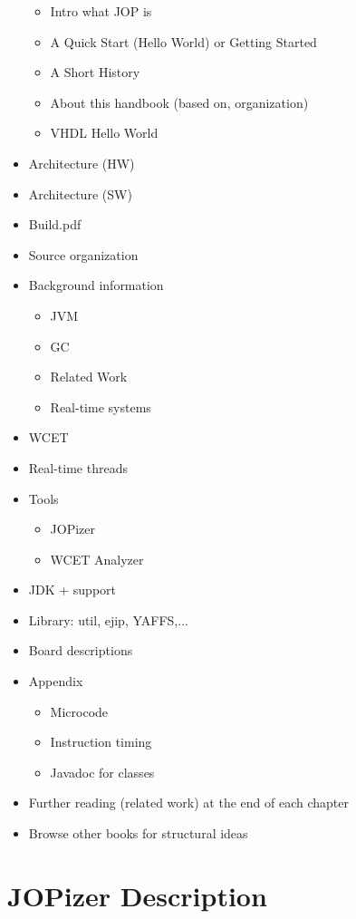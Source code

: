 \begin{itemize}
    \begin{itemize}
        \item Intro what JOP is
        \item A Quick Start (Hello World) or Getting Started
        \item A Short History
        \item About this handbook (based on, organization)
        \item VHDL Hello World
    \end{itemize}
    \item Architecture (HW)
    \item Architecture (SW)
    \item Build.pdf
    \item Source organization
    \item Background information
    \begin{itemize}
        \item JVM
        \item GC
        \item Related Work
        \item Real-time systems
    \end{itemize}
    \item WCET
    \item Real-time threads
    \item Tools
    \begin{itemize}
        \item JOPizer
        \item WCET Analyzer
    \end{itemize}
    \item JDK + support
    \item Library: util, ejip, YAFFS,...
    \item Board descriptions
    \item Appendix
    \begin{itemize}
        \item Microcode
        \item Instruction timing
        \item Javadoc for classes
    \end{itemize}
    \item Further reading (related work) at the end of each chapter
    \item Browse other books for structural ideas
\end{itemize}

\section{JOPizer Description}

